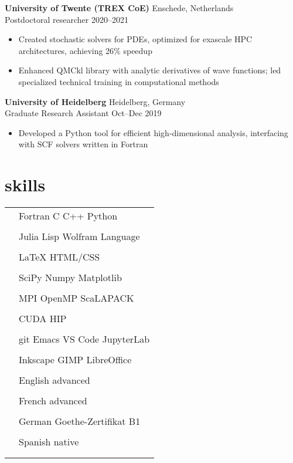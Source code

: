 \documentclass[12pt]{article}
\newcommand{\entry}[4]{{{\textbf{#1}}} \hfill #3 \\ #2 \hfill #4}
\newcommand{\tableentry}[3]{\textsc{#1} & #2\expandafter\ifstrequal\expandafter{#3}{}{\\}{\\[6pt]}}
\begin{document}
\begin{paracol}{2}
    \entry{University of Twente (TREX CoE)}{Postdoctoral researcher}{Enschede, Netherlands}{2020--2021}
    \begin{itemize}[noitemsep,leftmargin=3.5mm,rightmargin=0mm,topsep=6pt]
    \item Created stochastic solvers for PDEs, optimized for exascale HPC architectures, achieving 26\% speedup
    \item Enhanced QMCkl library with analytic derivatives of wave functions; led specialized technical training in computational methods
    \end{itemize}

    \entry{University of Heidelberg}{Graduate Research Assistant}{Heidelberg, Germany}{Oct--Dec 2019}
    \begin{itemize}[noitemsep,leftmargin=3.5mm,rightmargin=0mm,topsep=6pt]
    \item Developed a Python tool for efficient high-dimensional analysis, interfacing with SCF solvers written in Fortran
    \end{itemize}

    \switchcolumn{}

    \section{skills}
    \begin{supertabular}{rl}
      \tableentry{\footnotesize\faCode}{Fortran \textperiodcentered{} C
        \textperiodcentered{} C++ \textperiodcentered{} Python}{}
      \tableentry{}{Julia \textperiodcentered{} Lisp \textperiodcentered{} Wolfram Language}{}
      \tableentry{}{LaTeX \textperiodcentered{} HTML/CSS}{}
      \tableentry{\footnotesize\faCogs}{SciPy \textperiodcentered{} Numpy \textperiodcentered{} Matplotlib}{}
      \tableentry{}{MPI \textperiodcentered{} OpenMP \textperiodcentered{} ScaLAPACK}{}
      \tableentry{}{CUDA \textperiodcentered{} HIP}{}
      \tableentry{\footnotesize\faLaptop}{git \textperiodcentered{}  Emacs \textperiodcentered{} VS Code \textperiodcentered{} JupyterLab}{}
      \tableentry{}{Inkscape \textperiodcentered{} GIMP \textperiodcentered{}  LibreOffice}{}

      \tableentry{\footnotesize\faLanguage}{English \textperiodcentered{} advanced}{}
      \tableentry{}{French \textperiodcentered{} advanced}{}
      \tableentry{}{German \textperiodcentered{} Goethe-Zertifikat B1}{}
      \tableentry{}{Spanish \textperiodcentered{} native}{}
    \end{supertabular}


\end{paracol}
\end{document}
